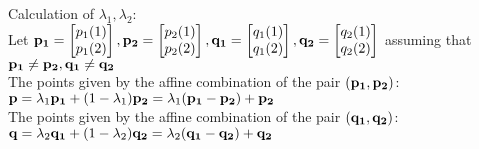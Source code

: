 \documentclass[11pt]{article}
\begin{document}
\begin{enumerate}
		Calculation of $\lambda_1,\lambda_2$:\\
		Let ${\bf p_1}=\begin{bmatrix}
			p_1(1)\\p_1(2)
		\end{bmatrix},{\bf p_2}=\begin{bmatrix}
		p_2(1)\\p_2(2)
		\end{bmatrix},{\bf q_1}=\begin{bmatrix}
		q_1(1)\\q_1(2)
		\end{bmatrix},{\bf q_2}=\begin{bmatrix}
		q_2(1)\\q_2(2)
		\end{bmatrix}$ assuming that ${\bf p_1}\ne {\bf p_2},{\bf q_1}\ne {\bf q_2}$\\
	
		The points given by the affine combination of the pair $({\bf p_1},{\bf p_2})$:\\
		$\displaystyle {\bf p}=\lambda_1{\bf p_1}+(1-\lambda_1){\bf p_2}=\lambda_1({\bf p_1}-{\bf p_2})+{\bf p_2}$\\
		
		The points given by the affine combination of the pair $({\bf q_1},{\bf q_2})$:\\
		$\displaystyle {\bf q}=\lambda_2{\bf q_1}+(1-\lambda_2){\bf q_2}=\lambda_2({\bf q_1}-{\bf q_2})+{\bf q_2}$\\
		

\end{enumerate}
\end{document}
